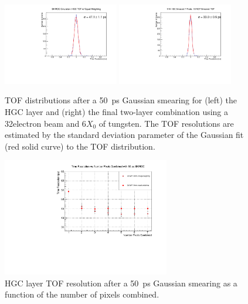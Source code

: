 \begin{figure}[h] 
\centering
\includegraphics[width=0.45\textwidth]{HGC/deltaTPicoSilEqualSmear50.pdf} 
\includegraphics[width=0.45\textwidth]{HGC/deltaT_PicoSilEqual_MCP_Equal_BothSmear50.pdf} 
\caption{TOF distributions after a 50~ps Gaussian smearing for (left)
  the HGC layer and (right) the final two-layer combination using a
32\GeV electron beam and 6$X_{0}$ of tungsten. The TOF resolutions are estimated by the
standard deviation parameter of the Gaussian fit (red solid curve) to
the TOF distribution.} 

\label{hgc:tof2_smear} 
\end{figure}
\begin{figure}[h] 
\centering
\includegraphics[width=0.65\textwidth]{HGC/smearing_50_10mm.pdf} 
\caption{HGC layer TOF resolution after a 50~ps Gaussian smearing as a function of the number of
  pixels combined.} 
\label{hgc:tof_vs_pixel_smear} 
\end{figure}

